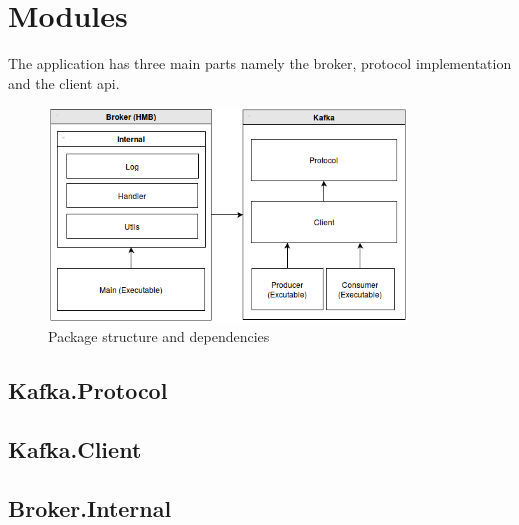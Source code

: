 \section{Modules}
The application has three main parts namely the broker, protocol implementation
and the client api. 

\begin{figure}[H]
    \centering
   \includegraphics[width=0.85\textwidth]{images/logical-architecture.png}
    \caption{Package structure and dependencies}
    \label{fig:logical-architecture}
\end{figure}



\subsection{Kafka.Protocol}

\subsection{Kafka.Client}

\subsection{Broker.Internal}




